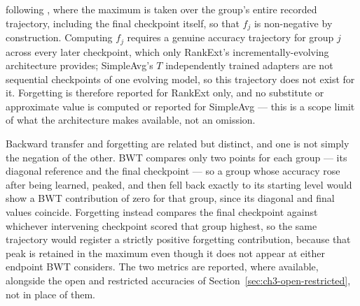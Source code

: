 following \cite{chaudhry2018riemannian}, where the maximum is taken over the
group's entire recorded trajectory, including the final checkpoint itself,
so that $f_j$ is non-negative by construction. Computing $f_j$ requires a genuine
accuracy trajectory for group $j$ across every later checkpoint, which only
RankExt's incrementally-evolving architecture provides; SimpleAvg's $T$
independently trained adapters are not sequential checkpoints of
one evolving model, so this trajectory does not exist for it. Forgetting is
therefore reported for RankExt only, and no substitute or approximate value
is computed or reported for SimpleAvg --- this is a scope limit of what the
architecture makes available, not an omission.

Backward transfer and forgetting are related but distinct, and one is not
simply the negation of the other. BWT compares only two points for each
group --- its diagonal reference and the final checkpoint --- so a group whose
accuracy rose after being learned, peaked, and then fell back exactly to
its starting level would show a BWT contribution of zero for that group,
since its diagonal and final values coincide. Forgetting instead compares the final checkpoint against
whichever intervening checkpoint scored that group highest, so the same
trajectory would register a strictly positive forgetting contribution,
because that peak is retained in the maximum even though it does not
appear at either endpoint BWT considers. The two metrics are reported,
where available, alongside the open and restricted accuracies of Section~\ref{sec:ch3-open-restricted},
not in place of them.
